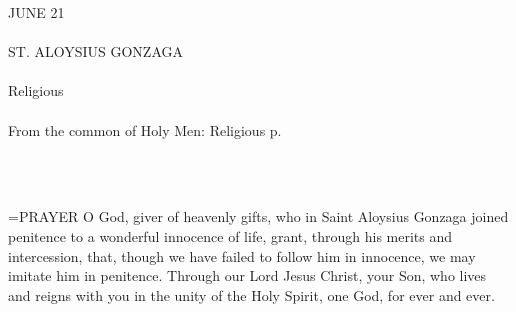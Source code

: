 \begin{center}\normalsize \begin{center}\normalsize JUNE 21\\\\
\footnotesize \footnotesize ST. ALOYSIUS GONZAGA\\\\
\footnotesize \footnotesize Religious\\\\
\footnotesize \footnotesize From the common of Holy Men: Religious p. \\\\
\footnotesize \end{center}\\
\end{center}

\hangindent=\parindent \small{PRAYER 
O God, giver of heavenly gifts,
who in Saint Aloysius Gonzaga
joined penitence to a wonderful innocence of life,
grant, through his merits and intercession,
that, though we have failed to follow him in innocence,
we may imitate him in penitence.
Through our Lord Jesus Christ, your Son,
who lives and reigns with you in the unity of the Holy Spirit,
one God, for ever and ever.\\}
 
